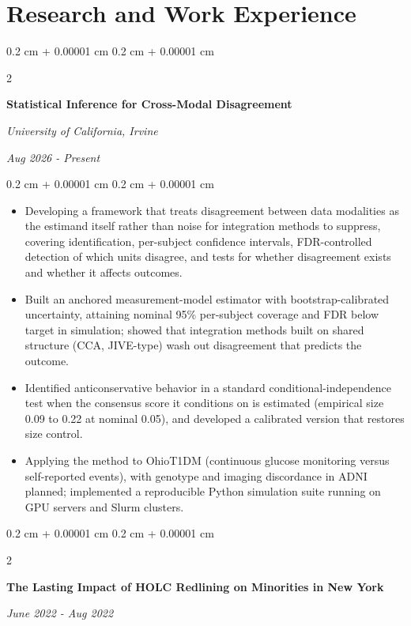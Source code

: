 \documentclass[10pt, letterpaper]{article}
\newenvironment{highlights}{
    \begin{itemize}[
        topsep=0.10 cm,
        parsep=0.10 cm,
        partopsep=0pt,
        itemsep=0pt,
        leftmargin=0.4 cm + 10pt
    ]
}{
    \end{itemize}
} %
\newenvironment{onecolentry}{
    \begin{adjustwidth}{
        0.2 cm + 0.00001 cm
    }{
        0.2 cm + 0.00001 cm
    }
}{
    \end{adjustwidth}
} %
\newenvironment{twocolentry}[2][]{
    \onecolentry
    \def\secondColumn{#2}
    \setcolumnwidth{\fill, 4.5 cm}
    \begin{paracol}{2}
}{
    \switchcolumn \raggedleft \secondColumn
    \end{paracol}
    \endonecolentry
} %
\begin{document}
        \section{Research and Work Experience}
        \begin{twocolentry}{
        \textit{Aug 2026 - Present}}
            \textbf{Statistical Inference for Cross-Modal Disagreement}

            \textit{University of California, Irvine}
        \end{twocolentry}
        \vspace{0.10 cm}
        \begin{onecolentry}
            \begin{highlights}
                \item Developing a framework that treats disagreement between data modalities as the estimand itself rather than noise for integration methods to suppress, covering identification, per-subject confidence intervals, FDR-controlled detection of which units disagree, and tests for whether disagreement exists and whether it affects outcomes.
                \item Built an anchored measurement-model estimator with bootstrap-calibrated uncertainty, attaining nominal 95\% per-subject coverage and FDR below target in simulation; showed that integration methods built on shared structure (CCA, JIVE-type) wash out disagreement that predicts the outcome.
                \item Identified anticonservative behavior in a standard conditional-independence test when the consensus score it conditions on is estimated (empirical size 0.09 to 0.22 at nominal 0.05), and developed a calibrated version that restores size control.
                \item Applying the method to OhioT1DM (continuous glucose monitoring versus self-reported events), with genotype and imaging discordance in ADNI planned; implemented a reproducible Python simulation suite running on GPU servers and Slurm clusters.
            \end{highlights}
        \end{onecolentry}

        \begin{twocolentry}{
        \textit{June 2022 - Aug 2022}}
            \textbf{The Lasting Impact of HOLC Redlining on Minorities in New York}
        \end{twocolentry}
        
\end{document}
